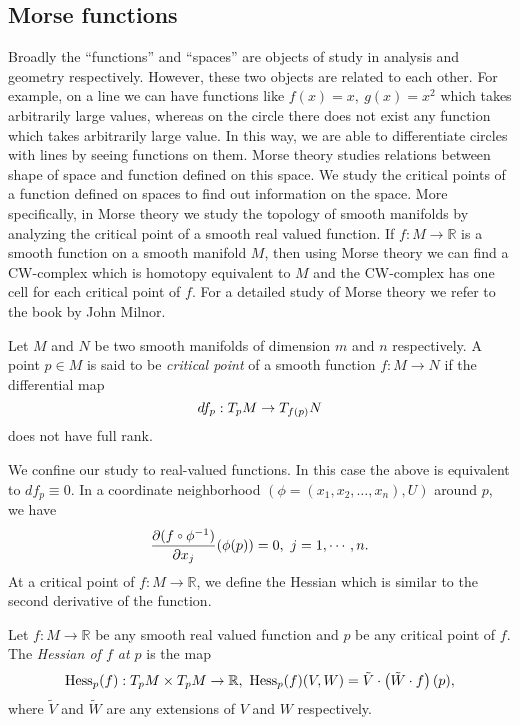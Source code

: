 \subsection{Morse functions}
\hfb Broadly the ``functions'' and ``spaces'' are objects of study in analysis and geometry respectively. However, these two objects are related to each other. For example, on a line we can have functions like $f(x)=x,~g(x)=x^2$ which takes arbitrarily large values, whereas on the circle there does not exist any function which takes arbitrarily large value. In this way, we are able to differentiate circles with lines by seeing functions on them. Morse theory studies relations between shape of space and function defined on this space. We study the critical points of a function defined on spaces to find out information on the space. More specifically, in Morse theory we study the topology of smooth manifolds by analyzing the critical point of a smooth real valued function. If $f:M\to\mathbb{R}$ is a smooth function on a smooth manifold $M$, then using Morse theory we can find a CW-complex which is homotopy equivalent to $M$ and the CW-complex has one cell for each critical point of $f$. For a detailed study of Morse theory we refer to the book \cite{Mil63} by John Milnor.
\begin{defn} \label{defn:CriticalPoints}
    Let $M$ and $N$ be two smooth manifolds of dimension $m$ and $n$ respectively. A point $p\in M$ is said to be \emph{critical point} of a smooth function $f:M\to N$ if the differential map
    \begin{displaymath}
        df_p:T_pM\to T_{f(p)}N\index{$df_p$}
    \end{displaymath}
    does not have full rank.
\end{defn}

\bigskip 

\noindent We confine our study to real-valued functions. In this case the above is equivalent to $df_p\equiv 0$. In a coordinate neighborhood $(\phi=(x_1,x_2,\ldots,x_n),U)$ around $p$, we have 
\begin{equation}\label{eq:LocalExpressionOfCriticalPoint}
    \delbydel{(f\comp \phi^{-1})}{x_j}(\phi(p))=0,~j=1,\cdots,n.
\end{equation} At a critical point of $f:M\to \mathbb{R}$, we define the Hessian which is similar to the second derivative of the function. 
\begin{defn}[Hessian of $f$ at $p$]\label{defn:Hessian}
    Let $f:M\to \mathbb{R}$ be any smooth real valued function and $p$ be any critical point of $f$. The \emph{Hessian of $f$ at $p$} is the map
    \begin{equation}\label{eq:LocalExpressionOfHessianMap}
        \hess_p(f):T_pM \times T_pM\to \mathbb{R},~\hess_p(f)(V,W)=\tilde{V}\cdot \left(\tilde{W}\cdot f\right)(p),\index{$\hess_p(f)$}
    \end{equation}
    where $\tilde{V}$ and $\tilde{W}$ are any extensions of $V$ and $W$ respectively.
\end{defn}


